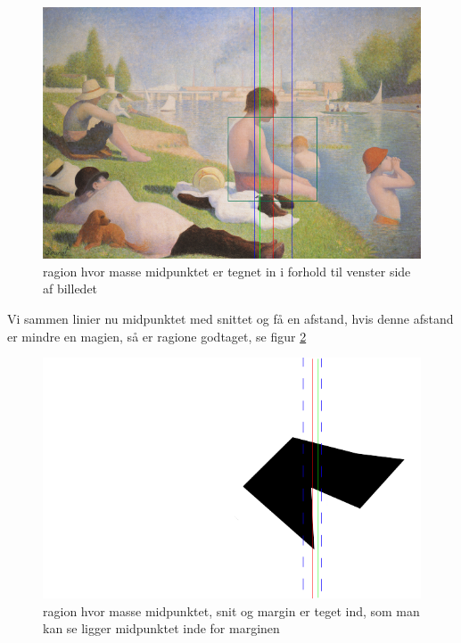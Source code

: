 \begin{figure}[h]
	\begin{center}
		\includegraphics[scale=0.76,angle=0]{afsnit/vores_implementation/billeder/udvidet_loesning/centerOfMass.png}
	\end{center}
	\caption[]{ragion hvor masse midpunktet er tegnet in i forhold til venster side af billedet}
	\label{midpunkt}
\end{figure}

Vi sammen linier nu midpunktet med snittet og få en afstand, hvis denne
afstand er mindre en magien, så er ragione godtaget, se figur
\ref{cOMCutMargin}

\begin{figure}[h]
	\begin{center}
		\includegraphics[scale=0.76,angle=0]{afsnit/vores_implementation/billeder/udvidet_loesning/cOMCutMargin.png}
	\end{center}
	\caption[]{ragion hvor masse midpunktet, snit og margin er teget ind, som man kan se ligger midpunktet inde for marginen}
	\label{cOMCutMargin}
\end{figure}

